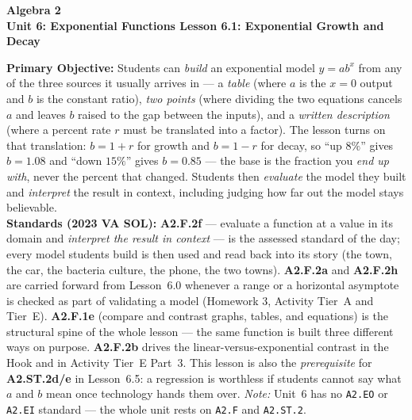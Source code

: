 \documentclass[10pt]{article}
\newcommand{\CourseName}{Algebra 2}
\newcommand{\UnitNumberName}{Unit 6: Exponential Functions \quad}
\newcommand{\LessonNumberName}{Lesson 6.1: Exponential Growth and Decay}
\begin{document}
\begin{center}
    {\Large\bfseries \CourseName \\
    {\small\bfseries \UnitNumberName \LessonNumberName}}
\end{center}

\begin{tcolorbox}[colback=forestbg, colframe=forest, boxrule=0.9pt, arc=2mm,
    left=2mm, right=2mm, top=1.5mm, bottom=1.5mm]
    \textbf{Primary Objective:} Students can \emph{build} an exponential model $y=ab^{x}$ from any of
    the three sources it usually arrives in --- a \emph{table} (where $a$ is the $x=0$ output and $b$
    is the constant ratio), \emph{two points} (where dividing the two equations cancels $a$ and
    leaves $b$ raised to the gap between the inputs), and a \emph{written description} (where a
    percent rate $r$ must be translated into a factor). The lesson turns on that translation:
    $b=1+r$ for growth and $b=1-r$ for decay, so ``up $8\%$'' gives $b=1.08$ and ``down $15\%$''
    gives $b=0.85$ --- the base is the fraction you \emph{end up with}, never the percent that
    changed. Students then \emph{evaluate} the model they built and \emph{interpret} the result in
    context, including judging how far out the model stays believable.
    \\[2pt]
    \textbf{Standards (2023 VA SOL):} \textbf{A2.F.2f} --- evaluate a function at a value in its
    domain and \emph{interpret the result in context} --- is the assessed standard of the day; every
    model students build is then used and read back into its story (the town, the car, the bacteria
    culture, the phone, the two towns). \textbf{A2.F.2a} and \textbf{A2.F.2h} are carried forward
    from Lesson~6.0 whenever a range or a horizontal asymptote is checked as part of validating a
    model (Homework 3, Activity Tier~A and Tier~E). \textbf{A2.F.1e} (compare and contrast graphs,
    tables, and equations) is the structural spine of the whole lesson --- the same function is
    built three different ways on purpose. \textbf{A2.F.2b} drives the linear-versus-exponential
    contrast in the Hook and in Activity Tier~E Part~3. This lesson is also the \emph{prerequisite}
    for \textbf{A2.ST.2d/e} in Lesson~6.5: a regression is worthless if students cannot say what $a$
    and $b$ mean once technology hands them over. \emph{Note:} Unit~6 has no \texttt{A2.EO} or
    \texttt{A2.EI} standard --- the whole unit rests on \texttt{A2.F} and \texttt{A2.ST.2}.
\end{tcolorbox}
\end{document}
